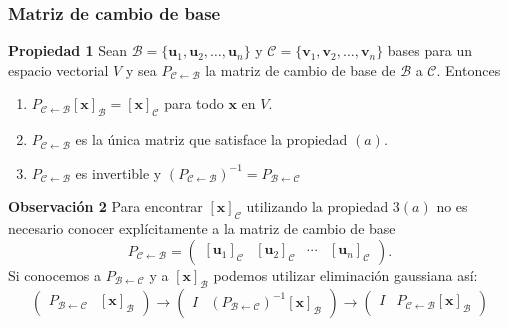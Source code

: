 {\nologo
\begin{frame}\frametitle{Matriz de cambio de base}

\begin{prop}{\textbf{Propiedad 1}}
	\justifying
	Sean $\mathcal{B}=\{\mathbf{u}_1, \mathbf{u}_2, \hdots , \mathbf{u}_n \}$ y $\mathcal{C}=\{\mathbf{v}_1, \mathbf{v}_2, \hdots , \mathbf{v}_n \}$  bases para un espacio  vectorial $V$ y sea $P_{\mathcal{C} \leftarrow\mathcal{B}}$ la matriz de cambio 
	de base de $\mathcal{B}$ a $\mathcal{C}$. Entonces
	\begin{enumerate}
		\item[\labelname{$a$}] $P_{\mathcal{C} \leftarrow\mathcal{B}}\left[ \mathbf{x} \right]_{\mathcal{B}}=\left[ \mathbf{x} \right]_{\mathcal{C}}$ para todo $\mathbf{x}$ en $V$.
		\item[\labelname{$b$}] $P_{\mathcal{C} \leftarrow\mathcal{B}}$ es la única matriz que satisface la propiedad $(a)$.
		\item[\labelname{$c$}] $P_{\mathcal{C} \leftarrow\mathcal{B}}$ es invertible y $\left(P_{\mathcal{C} \leftarrow\mathcal{B}}\right)^{-1}=P_{\mathcal{B} \leftarrow\mathcal{C}}$		
	\end{enumerate}
\end{prop}	

\begin{alertblock}{\textbf{Observación 2}}\justifying
	Para encontrar $\left[ \mathbf{x} \right]_{\mathcal{C}}$ utilizando la propiedad 3$(a)$ no es necesario conocer explícitamente a
	la matriz de cambio de base
	\[	
	P_{\mathcal{C} \leftarrow\mathcal{B}} =
	\left( 
	\begin{array}{c|c|c|c} \left[ \mathbf{u}_1 \right]_{\mathcal{C}} & \left[ \mathbf{u}_2 \right]_{\mathcal{C}} & \cdots & \left[ \mathbf{u}_n \right]_{\mathcal{C}}
	\end{array} 
	\right).
	\]
	Si conocemos a $P_{\mathcal{B} \leftarrow\mathcal{C}}$ y a $\left[ \mathbf{x} \right]_{\mathcal{B}}$ podemos utilizar eliminación gaussiana así:
	\[	
	\left( 
	\begin{array}{c|c} P_{\mathcal{B} \leftarrow\mathcal{C}} & \left[ \mathbf{x} \right]_{\mathcal{B}}
	\end{array} 
	\right)
	\longrightarrow
	\left( 
	\begin{array}{c|c} I & \left(P_{\mathcal{B} \leftarrow\mathcal{C}}\right)^{-1}\left[ \mathbf{x} \right]_{\mathcal{B}}
	\end{array} 
	\right)
	\longrightarrow
	\left( 
	\begin{array}{c|c} I & P_{\mathcal{C} \leftarrow\mathcal{B}}\left[ \mathbf{x} \right]_{\mathcal{B}}
	\end{array} 
	\right)
	\]
\end{alertblock}

\end{frame}
}

